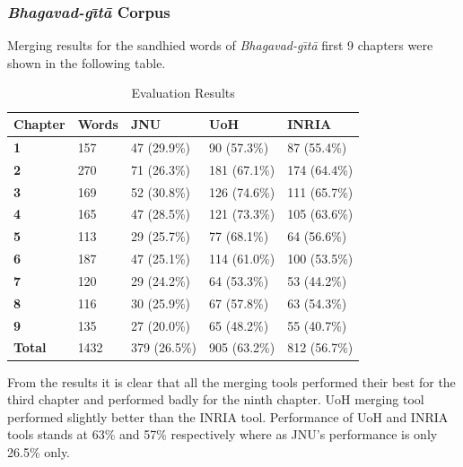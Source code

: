 \documentclass[11pt]{article}
\begin{document}
\subsubsection{\textit{Bhagavad-g\={\i}t\={a}} Corpus}
Merging results for the sandhied words of \textit{Bhagavad-g\={\i}t\={a}} first 9 chapters were shown in the following table.

\begin{table}[h]
	\begin{center}
		\begin{tabular}{|p{1cm} | p{1cm}|p{1.2cm} | p{1.2cm} | p{1.2cm} |}
			\hline 
			\bf Chapter & \bf Words &\bf JNU & \bf UoH & \bf INRIA \\
			\hline
			
		\bf	1	&	157	&	47 (29.9\%)	&	90 (57.3\%)	&	87 (55.4\%)	\\	\hline
		\bf	2	&	270	&	71 (26.3\%)	&	181 (67.1\%)	&	174 (64.4\%)	\\	\hline
		\bf	3	&	169	&	52 (30.8\%)	&	126 (74.6\%)	&	111	(65.7\%)	\\	\hline
		\bf	4	&	165	&	47 (28.5\%)	&	121 (73.3\%)	&	105	(63.6\%)	\\	\hline
		\bf	5	&	113	&	29 (25.7\%)	&	77 (68.1\%)	&	64	(56.6\%)	\\	\hline
		\bf	6	&	187	&	47 (25.1\%)	&	114 (61.0\%)	&	100	(53.5\%)	\\	\hline
		\bf	7	&	120	&	29 (24.2\%)	&	64	(53.3\%)	&	53	(44.2\%)	\\	\hline
		\bf	8	&	116	&	30 (25.9\%)	&	67	(57.8\%)	&	63	(54.3\%)	\\	\hline
		\bf	9	&	135	&	27 (20.0\%)	&	65	(48.2\%)	&	55	(40.7\%)	\\	\hline
		\bf	Total	&	1432	&	379 (26.5\%)	&	905	(63.2\%)	&	812	(56.7\%)	\\	\hline
		\end{tabular}
	\end{center}
	\caption{\label{font-table} Evaluation Results }
\end{table}

From the results it is clear that all the merging tools performed their best for the third chapter and performed badly for the ninth chapter.  UoH merging tool performed slightly better than the INRIA tool. Performance of UoH and INRIA tools stands at 63\% and 57\% respectively where as JNU's performance is only 26.5\% only.

\end{document}

